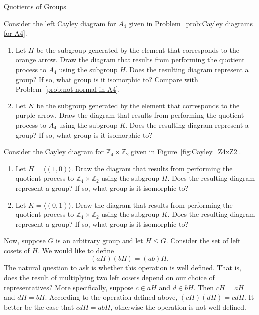 \begin{section}{Quotients of Groups}
\begin{problem}
Consider the left Cayley diagram for $A_4$ given in Problem~\ref{prob:Cayley diagrams for A4}.  
\begin{enumerate}[label=\textrm{(\alph*)}]
\item  Let $H$ be the subgroup generated by the element that corresponds to the \textcolor{cb-orange}{orange} arrow. Draw the diagram that results from performing the quotient process to $A_4$ using the subgroup $H$.  Does the resulting diagram represent a group?  If so, what group is it isomorphic to? Compare with Problem~\ref{prob:not normal in A4}.
\item Let $K$ be the subgroup generated by the element that corresponds to the \textcolor{cb-purple}{purple} arrow. Draw the diagram that results from performing the quotient process to $A_4$ using the subgroup $K$.  Does the resulting diagram represent a group?  If so, what group is it isomorphic to?
\end{enumerate}
\end{problem}

\begin{problem}
Consider the Cayley diagram for $\mathbb{Z}_4\times \mathbb{Z}_2$ given in Figure~\ref{fig:Cayley_Z4xZ2}.
\begin{enumerate}[label=\textrm{(\alph*)}]
\item  Let $H=\langle (1,0)\rangle$. Draw the diagram that results from performing the quotient process to $\mathbb{Z}_4\times \mathbb{Z}_2$ using the subgroup $H$.  Does the resulting diagram represent a group?  If so, what group is it isomorphic to?
\item Let $K=\langle (0,1)\rangle$. Draw the diagram that results from performing the quotient process to $\mathbb{Z}_4\times \mathbb{Z}_2$ using the subgroup $K$.  Does the resulting diagram represent a group?  If so, what group is it isomorphic to?
\end{enumerate}
\end{problem}

Now, suppose $G$ is an arbitrary group and let $H\leq G$. Consider the set of left cosets of $H$.  We would like to define
\[
(aH)(bH)=(ab)H.
\]
The natural question to ask is whether this operation is well defined.  That is, does the result of multiplying two left cosets depend on our choice of representatives?  More specifically, suppose $c\in aH$ and $d\in bH$.  Then $cH=aH$ and $dH=bH$.  According to the operation defined above, $(cH)(dH)=cdH$.  It better be the case that $cdH=abH$, otherwise the operation is not well defined.


\end{section}
